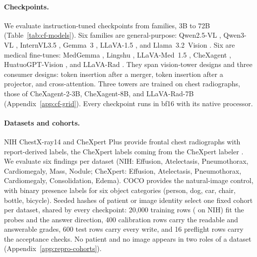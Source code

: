 \documentclass{article}
\begin{document}
\paragraph{Checkpoints.}
We evaluate \cfCheckpoints{} instruction-tuned checkpoints from \cfFamiliesWord{} families, 3B to 72B (Table~\ref{tab:cf-models}). Six families are general-purpose: Qwen2.5-VL \citep{bai2025qwen25vl}, Qwen3-VL \citep{qwen2025qwen3vl}, InternVL3.5 \citep{wang2025internvl35}, Gemma~3 \citep{gemma2025gemma3}, LLaVA-1.5 \citep{liu2024improved}, and Llama~3.2~Vision \citep{meta2024llama32vision}. Six are medical fine-tunes: MedGemma \citep{sellergren2025medgemma}, Lingshu \citep{lasa2025lingshu}, LLaVA-Med~1.5 \citep{li2023llavamed}, CheXagent \citep{chen2024chexagent}, HuatuoGPT-Vision \citep{chen2024huatuogptvision}, and LLaVA-Rad \citep{zambranochaves2025llavarad}. They span \cfTowerDesignsWord{} vision-tower designs and three consumer designs: token insertion after a merger, token insertion after a projector, and cross-attention. Three towers are trained on chest radiographs, those of CheXagent-2-3B, CheXagent-8B, and LLaVA-Rad-7B (Appendix~\ref{app:cf-grid}). Every checkpoint runs in bf16 with its native processor.

\paragraph{Datasets and cohorts.}
NIH ChestX-ray14 \citep{wang2017chestxray} and CheXpert Plus \citep{chambon2024chexpertplus} provide frontal chest radiographs with report-derived labels, the CheXpert labels coming from the CheXpert labeler \citep{irvin2019chexpert}. We evaluate six findings per dataset (NIH: Effusion, Atelectasis, Pneumothorax, Cardiomegaly, Mass, Nodule; CheXpert: Effusion, Atelectasis, Pneumothorax, Cardiomegaly, Consolidation, Edema). COCO \citep{lin2014coco} provides the natural-image control, with binary presence labels for six object categories (person, dog, car, chair, bottle, bicycle). Seeded hashes of patient or image identity select one fixed cohort per dataset, shared by every checkpoint: 20{,}000 training rows (\cfCohortNihTrainRows{} on NIH) fit the probes and the answer direction, 400 calibration rows carry the readable and answerable grades, 600 test rows carry every write, and 16 preflight rows carry the acceptance checks. No patient and no image appears in two roles of a dataset (Appendix~\ref{app:repro-cohorts}).
\end{document}
